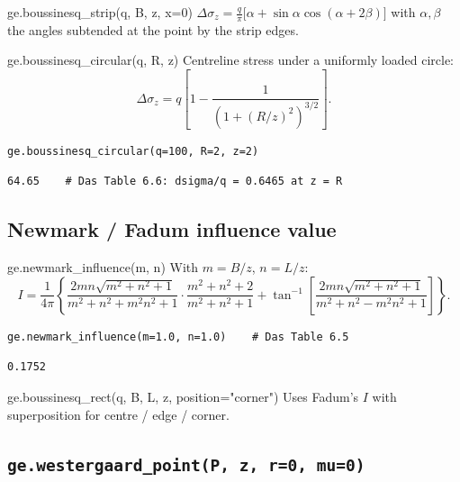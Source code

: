 \documentclass[11pt,a4paper,openany]{book}
\begin{document}
\begin{funcbox}{ge.boussinesq\_strip(q, B, z, x=0)}
$\Delta\sigma_z = \tfrac{q}{\pi}\bigl[\alpha + \sin\alpha\cos(\alpha + 2\beta)\bigr]$
with $\alpha, \beta$ the angles subtended at the point by the
strip edges.
\end{funcbox}

\begin{funcbox}{ge.boussinesq\_circular(q, R, z)}
Centreline stress under a uniformly loaded circle:
\[
\Delta\sigma_z = q\!\left[1 - \frac{1}{(1 + (R/z)^2)^{3/2}}\right].
\]
\end{funcbox}

\begin{lstlisting}
ge.boussinesq_circular(q=100, R=2, z=2)
\end{lstlisting}
\begin{lstlisting}[style=output]
64.65    # Das Table 6.6: dsigma/q = 0.6465 at z = R
\end{lstlisting}

\subsection{Newmark / Fadum influence value}

\begin{funcbox}{ge.newmark\_influence(m, n)}
With $m = B/z$, $n = L/z$:
\[
I = \frac{1}{4\pi}\!\left\{
\frac{2mn\sqrt{m^2+n^2+1}}{m^2+n^2+m^2n^2+1}\cdot
\frac{m^2+n^2+2}{m^2+n^2+1}
+ \tan^{-1}\!\left[\frac{2mn\sqrt{m^2+n^2+1}}{m^2+n^2-m^2n^2+1}\right]\right\}.
\]
\end{funcbox}

\begin{lstlisting}
ge.newmark_influence(m=1.0, n=1.0)    # Das Table 6.5
\end{lstlisting}
\begin{lstlisting}[style=output]
0.1752
\end{lstlisting}

\begin{funcbox}{ge.boussinesq\_rect(q, B, L, z, position="corner")}
Uses Fadum's $I$ with superposition for centre / edge / corner.
\end{funcbox}

\subsection{\texttt{ge.westergaard\_point(P, z, r=0, mu=0)}}
\end{document}
